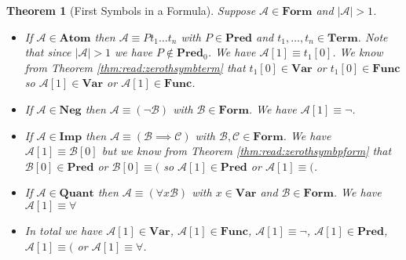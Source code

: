 \documentclass[12pt]{article}
\theoremstyle{break}
\theoremstyle{break}
\newtheorem{theorem}{Theorem}[section]
\theoremstyle{break}
\theoremstyle{break}
\theoremstyle{break}
\newtheorem{informal definition}[definition]{Informal Definition}
\newcommand{\mc}[1]{\mathcal{#1}}
\begin{document}
\begin{theorem}[First Symbols in a Formula]
\label{thm:read:firstsymbform}
Suppose $\mc{A}\in\textbf{Form}$ and $|\mc{A}|>1$.
\begin{itemize}
\item{If $\mc{A}\in\textbf{Atom}$ then $\mc{A}\equiv Pt_1\ldots t_n$ with $P\in\textbf{Pred}$ and $t_1,\ldots,t_n\in\textbf{Term}$.
Note that since $|\mc{A}|>1$ we have $P\not \in \textbf{Pred}_0$. We have $\mc{A}[1] \equiv t_1[0]$. We know from Theorem \ref{thm:read:zerothsymbterm} that $t_1[0] \in \textbf{Var}$ or $t_1[0] \in \textbf{Func}$ so $\mc{A}[1]\in \textbf{Var}$ or $\mc{A}[1] \in \textbf{Func}$.}
\item{If $\mc{A}\in\textbf{Neg}$ then $\mc{A} \equiv (\lnot \mc{B})$ with $\mc{B}\in\textbf{Form}$. We have $\mc{A}[1] \equiv \lnot$.}
\item{If $\mc{A}\in\textbf{Imp}$ then $\mc{A}\equiv (\mc{B} \implies \mc{C})$ with $\mc{B}, \mc{C}\in\textbf{Form}$. We have $\mc{A}[1] \equiv \mc{B}[0]$ but we know from Theorem \ref{thm:read:zerothsymbpform} that $\mc{B}[0] \in \textbf{Pred}$ or $\mc{B}[0] \equiv ($ so $\mc{A}[1]\in\textbf{Pred}$ or $\mc{A}[1] \equiv ($.}
\item{If $\mc{A} \in \textbf{Quant}$ then $\mc{A} \equiv (\forall x \mc{B})$ with $x\in \textbf{Var}$ and $\mc{B}\in\textbf{Form}$. We have $\mc{A}[1] \equiv \forall$}
\item{In total we have $\mc{A}[1] \in \textbf{Var}$, $\mc{A}[1]\in\textbf{Func}$, $\mc{A}[1] \equiv \lnot$, $\mc{A}[1]\in\textbf{Pred}$, $\mc{A}[1]\equiv ($ or $\mc{A}[1] \equiv \forall$.}
\end{itemize}
\end{theorem}
\end{document}
